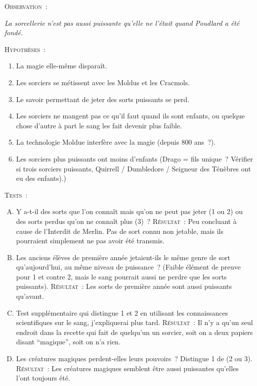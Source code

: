 \begin{centering}
\scshape Observation~:

\itshape La sorcellerie n'est pas aussi puissante qu'elle ne l'était quand Poudlard a été fondé.

\baselineskip

\scshape Hypothèses~:
\itshape
        \begin{enumerate}[1.]
        \item La magie elle-même disparaît.
        \item Les sorciers se métissent avec les Moldus et les Cracmols.
        \item Le savoir permettant de jeter des sorts puissants se perd.
        \item Les sorciers ne mangent pas ce qu'il faut quand ils sont enfants, ou quelque chose d'autre à part le sang les fait devenir plus faible.
        \item La technologie Moldue interfère avec la magie (depuis 800 ans~?).
        \item Les sorciers plus puissants ont moins d'enfants (Drago = fils unique~? Vérifier si trois sorciers puissants, Quirrell / Dumbledore / Seigneur des Ténèbres ont eu des enfants).)
        \end{enumerate}

\baselineskip

\scshape Tests~:
\itshape
        \begin{enumerate}[A.]
        \item Y a-t-il des sorts que l'on connaît mais qu'on ne peut pas jeter (1 ou 2) ou des sorts perdus qu'on ne connaît plus (3)~? {\scshape Résultat~:} Peu concluant à cause de l'Interdit de Merlin. Pas de sort connu non jetable, mais ils pourraient simplement ne pas avoir été transmis.
        \item Les anciens élèves de première année jetaient-ils le même genre de sort qu'aujourd'hui, au même niveau de puissance~? (Faible élément de preuve pour 1 et contre 2, mais le sang pourrait aussi ne perdre que les sorts puissants). {\scshape Résultat~:} Les sorts de première année sont aussi puissants qu'avant.
        \item Test supplémentaire qui distingue 1 et 2 en utilisant les connaissances scientifiques sur le sang, j'expliquerai plus tard. {\scshape Résultat~:} Il n'y a qu'un seul endroit dans la recette qui fait de quelqu'un un sorcier, soit on a deux papiers disant “magique”, soit on n'a rien.
        \item Les créatures magiques perdent-elles leurs pouvoirs~? Distingue 1 de (2 ou 3). {\scshape Résultat~:} Les créatures magiques semblent être aussi puissantes qu'elles l'ont toujours été.
        \end{enumerate}
\end{centering}

